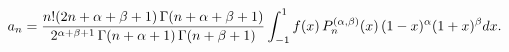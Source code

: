 \[a_{n}=\frac{n!(2n+\alpha+\beta+1)\mathop{\Gamma\/}\nolimits\!\left(n+\alpha+%
\beta+1\right)}{2^{\alpha+\beta+1}\mathop{\Gamma\/}\nolimits\!\left(n+\alpha+1%
\right)\mathop{\Gamma\/}\nolimits\!\left(n+\beta+1\right)}\*\int_{-1}^{1}f(x)%
\mathop{P^{(\alpha,\beta)}_{n}\/}\nolimits\!\left(x\right)(1-x)^{\alpha}(1+x)^%
{\beta}dx.\]